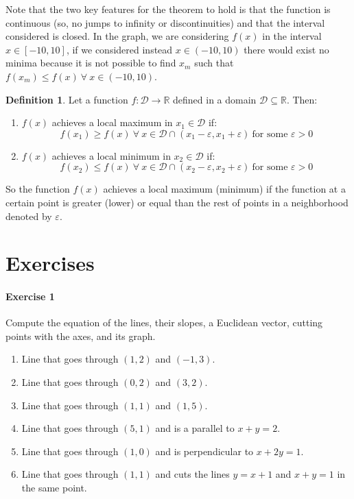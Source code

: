 \documentclass[a4paper,11pt]{article}
\theoremstyle{definition}
\newtheorem{definition}{Definition}
\theoremstyle{plain}
\begin{document}
    Note that the two key features for the theorem to hold is that the
function is continuous (so, no jumps to infinity or discontinuities) and
that the interval considered is closed. In the graph, we are considering
\(f(x)\) in the interval \(x\in[-10,10]\), if we considered instead
\(x\in(-10,10)\) there would exist no minima because it is not possible
to find \(x_m\) such that \(f(x_m) \leq f(x) \ \forall \ x\in(-10,10)\).

\begin{definition} 
Let a function
\(f : \mathcal{D}\rightarrow\mathbb{R}\) defined in a domain
\(\mathcal{D}\subseteq\mathbb{R}\). Then:

\begin{enumerate}
\def\labelenumi{\arabic{enumi}.}
\item
  \(f(x)\) achieves a local maximum in \(x_1\in\mathcal{D}\) if: \[
  f(x_1)\geq f(x) \ \forall \ x\in\mathcal{D}\cap(x_1-\varepsilon, x_1 + \varepsilon) \ \text{for some } \varepsilon > 0
  \]
\item
  \(f(x)\) achieves a local minimum in \(x_2\in\mathcal{D}\) if: \[
  f(x_2)\leq f(x) \ \forall \ x\in\mathcal{D}\cap(x_2-\varepsilon, x_2 + \varepsilon) \ \text{for some } \varepsilon > 0
  \]
\end{enumerate}
\end{definition}

So the function \(f(x)\) achieves a local maximum (minimum) if the
function at a certain point is greater (lower) or equal than the rest of
points in a neighborhood denoted by \(\varepsilon\).

\section{Exercises}\label{exercises}

\paragraph{Exercise 1}\label{exercise-1}

Compute the equation of the lines, their slopes, a Euclidean vector,
cutting points with the axes, and its graph.

\begin{enumerate}
\def\labelenumi{\arabic{enumi}.}
\item
  Line that goes through \((1,2)\) and \((-1,3)\).
\item
  Line that goes through \((0,2)\) and \((3,2)\).
\item
  Line that goes through \((1,1)\) and \((1,5)\).
\item
  Line that goes through \((5,1)\) and is a parallel to \(x + y = 2\).
\item
  Line that goes through \((1,0)\) and is perpendicular to
  \(x + 2y = 1\).
\item
  Line that goes through \((1,1)\) and cuts the lines \(y = x + 1\) and
  \(x + y = 1\) in the same point.
\end{enumerate}
\end{document}
